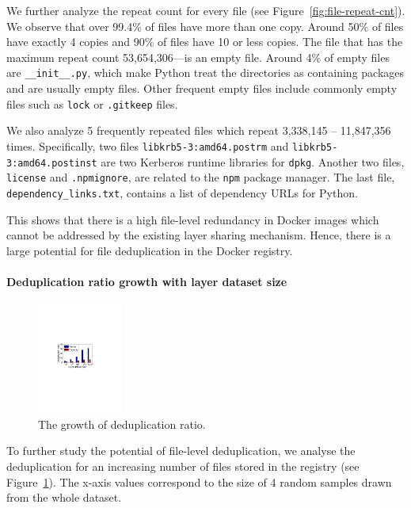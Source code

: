 We further analyze the repeat count for every file (see Figure~\ref{fig:file-repeat-cnt}).
%
%
We observe that over 99.4\% of files have more than one copy.
%
Around 50\% of files have exactly 4 copies and 90\% of files have 10 or less
copies. 
%
The file that has the maximum repeat count 53,654,306---is an empty file.
%
Around 4\% of empty files are \texttt{\_\_init\_\_.py}, which make Python treat the 
directories as containing packages and are usually empty files. 
Other frequent empty files include commonly empty files such as
\texttt{lock} or \texttt{.gitkeep} files.

We also analyze 5 frequently repeated files which repeat 3,338,145 -- 11,847,356 times.
Specifically, two files 
\texttt{libkrb5-3:amd64.postrm} and \texttt{libkrb5-3:amd64.postinst}
are two Kerberos runtime libraries for \texttt{dpkg}.
Another two files, \texttt{license} and \texttt{.npmignore}, are related to the \texttt{npm} package manager.
The last file, \texttt{dependency\_links.txt}, contains a list of dependency URLs for Python.

This shows that there is a high file-level redundancy in Docker images
which cannot be addressed by the existing layer sharing mechanism. Hence,
there is a large potential for file deduplication in the Docker registry.

\paragraph{Deduplication ratio growth with layer dataset size}

\begin{figure} 
	\centering
	\includegraphics[width=0.25\textwidth]{graphs/dedup-ratio-grow} 
	\caption{The growth of deduplication ratio.} 
	\label{fig:dedup-ratio-growth} 
\end{figure}

To further study the potential of file-level deduplication, we analyse the deduplication
for an increasing number of files stored in the registry (see Figure~\ref{fig:dedup-ratio-growth}).
%
%
The x-axis values correspond to the size of 4 random samples drawn from the whole dataset.


